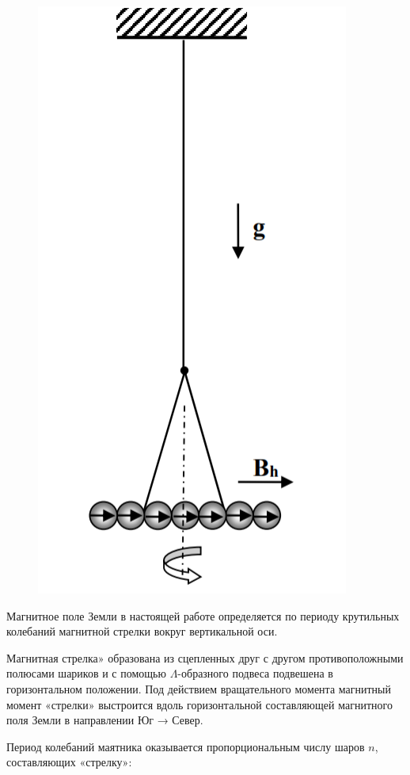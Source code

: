 \documentclass[a4paper,12pt]{article} %
\begin{document}
\begin{figure}[h!]
	\centering
	\includegraphics[scale=0.7]{Pictures/Гор.png}
\end{figure}

Магнитное поле Земли в настоящей работе определяется по периоду крутильных колебаний магнитной стрелки вокруг вертикальной оси.

Магнитная стрелка» образована из сцепленных друг с другом противоположными полюсами шариков и с помощью $\Lambda$-образного подвеса подвешена в горизонтальном положении. Под действием вращательного момента магнитный момент «стрелки» выстроится вдоль горизонтальной составляющей магнитного поля Земли в направлении Юг → Север.

Период колебаний маятника оказывается пропорциональным числу шаров $n$, составляющих «стрелку»:
\end{document}
